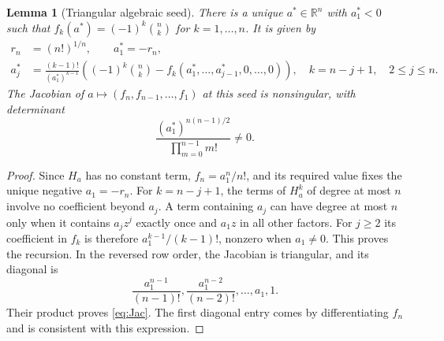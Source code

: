 \documentclass[11pt]{article}
\newtheorem{lemma}[theorem]{Lemma}
\theoremstyle{remark}\newtheorem{remark}[theorem]{Remark}
\newcommand{\R}{\mathbb R}\newcommand{\N}{\mathbb N}
\begin{document}
\begin{lemma}[Triangular algebraic seed]\label{lem:seed}
There is a unique $a^*\in\R^n$ with $a_1^*<0$ such that
$f_k(a^*)=(-1)^k\binom nk$ for $k=1,\ldots,n$. It is given by
\begin{align}\label{eq:seed}
 r_n&=(n!)^{1/n},\qquad a_1^*=-r_n,\\
 a_j^*&=\frac{(k-1)!}{(a_1^*)^{k-1}}
 \left((-1)^k\binom nk-f_k(a_1^*,\ldots,a_{j-1}^*,0,\ldots,0)\right),
 \quad k=n-j+1,\quad 2\le j\le n.\nonumber
\end{align}
The Jacobian of $a\mapsto(f_n,f_{n-1},\ldots,f_1)$ at this seed is
nonsingular, with determinant
\begin{equation}\label{eq:Jac}
 \frac{(a_1^*)^{n(n-1)/2}}{\prod_{m=0}^{n-1}m!}\ne0.
\end{equation}
\end{lemma}
\begin{proof}
Since $H_a$ has no constant term, $f_n=a_1^n/n!$, and its required value fixes
the unique negative $a_1=-r_n$. For $k=n-j+1$, the terms of $H_a^k$ of degree
at most $n$ involve no coefficient beyond $a_j$. A term containing $a_j$
can have degree at most $n$ only when it contains $a_jz^j$ exactly once and
$a_1z$ in all other factors. For $j\ge2$ its coefficient in $f_k$ is therefore
$a_1^{k-1}/(k-1)!$, nonzero when $a_1\ne0$. This proves the recursion.
In the reversed row order, the Jacobian is triangular, and its diagonal is
\[
 \frac{a_1^{n-1}}{(n-1)!},\frac{a_1^{n-2}}{(n-2)!},\ldots,a_1,1.
\]
Their product proves \eqref{eq:Jac}. The first diagonal entry comes by
differentiating $f_n$ and is consistent with this expression.
\end{proof}
\end{document}
